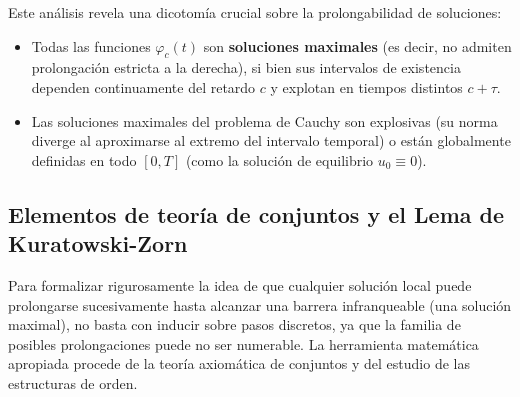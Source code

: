{\begin{center}
    \end{center}
}

\begin{observación}
    Este análisis revela una dicotomía crucial sobre la prolongabilidad de soluciones:
    \begin{itemize}
        \item Todas las funciones $\varphi_c(t)$ son \textbf{soluciones maximales} (es decir, no admiten prolongación estricta a la derecha), si bien sus intervalos de existencia dependen continuamente del retardo $c$ y explotan en tiempos distintos $c + \tau$.
        \item Las soluciones maximales del problema de Cauchy son explosivas (su norma diverge al aproximarse al extremo del intervalo temporal) o están globalmente definidas en todo $[0, T]$ (como la solución de equilibrio $u_0 \equiv 0$).
    \end{itemize}
\end{observación}

\subsection{Elementos de teoría de conjuntos y el Lema de Kuratowski-Zorn}

Para formalizar rigurosamente la idea de que cualquier solución local puede prolongarse sucesivamente hasta alcanzar una barrera infranqueable (una solución maximal), no basta con inducir sobre pasos discretos, ya que la familia de posibles prolongaciones puede no ser numerable. La herramienta matemática apropiada procede de la teoría axiomática de conjuntos y del estudio de las estructuras de orden.

